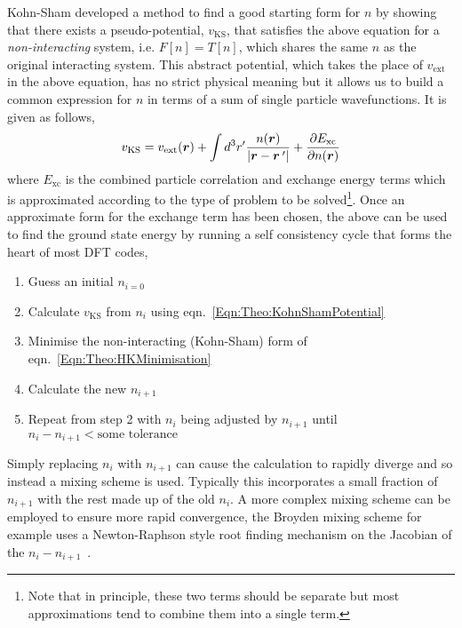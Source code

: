 Kohn-Sham developed a method to find a good starting form for $n$ by showing that there exists a pseudo-potential, $v_{\textrm{KS}}$, that satisfies the above equation for a \emph{non-interacting} system, i.e. $F[n] = T[n]$, which shares the same $n$ as the original interacting system. This abstract potential, which takes the place of $v_{\textrm{ext}}$ in the above equation, has no strict physical meaning but it allows us to build a common expression for $n$ in terms of a sum of single particle wavefunctions. It is given as follows,
\begin{equation}
\label{Eqn:Theo:KohnShamPotential}
v_{\textrm{KS}} = v_{\textrm{ext}}(\vect{r}) + \int d^3r^\prime\frac{n(\vect{r})}{|\vect{r}-\vect{r}^{\hspace{2px}\prime}|} + \frac{\partial E_{\textrm{xc}}}{\partial n(\vect{r})}
\end{equation}
where $E_{\textrm{xc}}$ is the combined particle correlation and exchange energy terms which is approximated according to the type of problem to be solved\footnote{Note that in principle, these two terms should be separate but most approximations tend to combine them into a single term.}.  Once an approximate form for the exchange term has been chosen, the above can be used to find the ground state energy by running a self consistency cycle that forms the heart of most \ac{DFT} codes,
\begin{enumerate}
    \item Guess an initial $n_{i=0}$
    \item Calculate $v_{\textrm{KS}}$ from $n_{i}$ using eqn.~\ref{Eqn:Theo:KohnShamPotential}
    \item Minimise the non-interacting (Kohn-Sham) form of eqn.~\ref{Eqn:Theo:HKMinimisation}
    \item Calculate the new $n_{i+1}$
    \item Repeat from step 2 with $n_i$ being adjusted by $n_{i+1}$ until $n_{i} - n_{i+1} < \textrm{some tolerance}$
\end{enumerate}
Simply replacing $n_{i}$ with $n_{i+1}$ can cause the calculation to rapidly diverge and so instead a mixing scheme is used. Typically this incorporates a small fraction of $n_{i+1}$ with the rest made up of the old $n_{i}$. A more complex mixing scheme can be employed to ensure more rapid convergence, the Broyden mixing scheme for example uses a Newton-Raphson style root finding mechanism on the Jacobian of the $n_{i} - n_{i+1}$~\cite{Broyden1965}.


